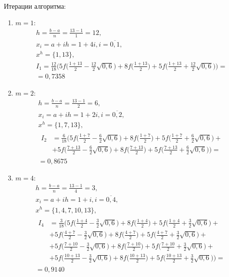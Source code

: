\documentclass[a4paper, 12pt]{article}
\begin{document}
	Итерации алгоритма:
	\begin{enumerate}
		\item $m=1$:
		\begin{equation*}
			\begin{gathered}
				h=\frac{b-a}{n}=\frac{13-1}{1}=12,\\
				x_i=a+ih=1+4i, i=\overline{0,1},\\
				x^h=\{1,13\},\\
				I_1=\frac{12}{18}\bigg(5f\bigg(\frac{1+13}{2}-\frac{12}{2}\sqrt{0,6}\bigg)+8f\bigg(\frac{1+13}{2}\bigg)+5f\bigg(\frac{1+13}{2}+\frac{12}{2}\sqrt{0,6}\bigg)\bigg)=\\=0,7358
			\end{gathered}
		\end{equation*}
		\item $m=2$:
		\begin{equation*}
			\begin{gathered}
				h=\frac{b-a}{n}=\frac{13-1}{2}=6,\\
				x_i=a+ih=1+2i, i=\overline{0,2},\\
				x^h=\{1,7,13\},\\
				\begin{aligned}
					I_2&=\frac{6}{18}\bigg(5f\bigg(\frac{1+7}{2}-\frac{6}{2}\sqrt{0,6}\bigg)+8f\bigg(\frac{1+7}{2}\bigg)+5f\bigg(\frac{1+7}{2}+\frac{6}{2}\sqrt{0,6}\bigg)+\\&+5f\bigg(\frac{7+13}{2}-\frac{6}{2}\sqrt{0,6}\bigg)+8f\bigg(\frac{7+13}{2}\bigg)+5f\bigg(\frac{7+13}{2}+\frac{6}{2}\sqrt{0,6}\bigg)\bigg)=
				\end{aligned}\\
				=0,8675
			\end{gathered}
		\end{equation*}
		\item $m=4$:
		\begin{equation*}
			\begin{gathered}
				h=\frac{b-a}{n}=\frac{13-1}{4}=3,\\
				x_i=a+ih=1+i, i=\overline{0,4},\\
				x^h=\{1,4,7,10,13\},\\
				\begin{aligned}
					I_4&=\frac{3}{18}\bigg(5f\bigg(\frac{1+4}{2}-\frac{3}{2}\sqrt{0,6}\bigg)+8f\bigg(\frac{1+4}{2}\bigg)+5f\bigg(\frac{1+4}{2}+\frac{3}{2}\sqrt{0,6}\bigg)+\\&+5f\bigg(\frac{4+7}{2}-\frac{3}{2}\sqrt{0,6}\bigg)+8f\bigg(\frac{4+7}{2}\bigg)+5f\bigg(\frac{4+7}{2}+\frac{3}{2}\sqrt{0,6}\bigg)+\\&+5f\bigg(\frac{7+10}{2}-\frac{3}{2}\sqrt{0,6}\bigg)+8f\bigg(\frac{7+10}{2}\bigg)+5f\bigg(\frac{7+10}{2}+\frac{3}{2}\sqrt{0,6}\bigg)+\\&+5f\bigg(\frac{10+13}{2}-\frac{3}{2}\sqrt{0,6}\bigg)+8f\bigg(\frac{10+13}{2}\bigg)+5f\bigg(\frac{10+13}{2}+\frac{3}{2}\sqrt{0,6}\bigg)\bigg)=
				\end{aligned}\\
				=0,9140
			\end{gathered}
	\end{equation*}
	\end{enumerate}
	
\end{document}
